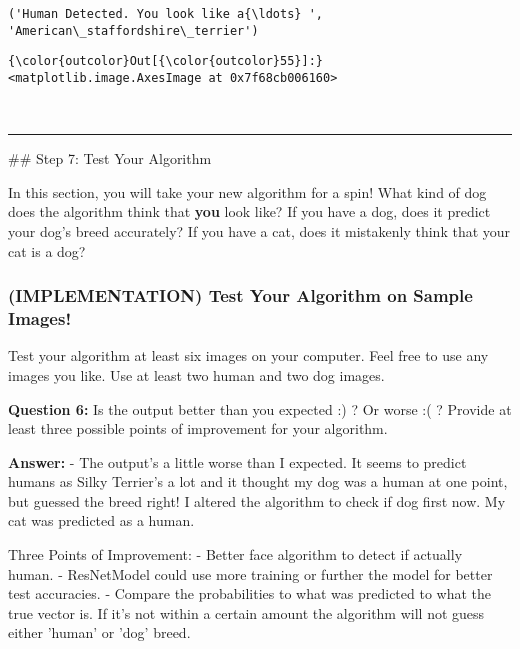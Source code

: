 \documentclass[11pt]{article}
\begin{document}
    \begin{Verbatim}[commandchars=\\\{\}]
('Human Detected. You look like a{\ldots} ', 'American\_staffordshire\_terrier')

    \end{Verbatim}

\begin{Verbatim}[commandchars=\\\{\}]
{\color{outcolor}Out[{\color{outcolor}55}]:} <matplotlib.image.AxesImage at 0x7f68cb006160>
\end{Verbatim}
            
    \begin{center}
    \end{center}
    { \hspace*{\fill} \\}
    
    \begin{center}\rule{0.5\linewidth}{\linethickness}\end{center}

 \#\# Step 7: Test Your Algorithm

In this section, you will take your new algorithm for a spin! What kind
of dog does the algorithm think that \textbf{you} look like? If you have
a dog, does it predict your dog's breed accurately? If you have a cat,
does it mistakenly think that your cat is a dog?

\subsubsection{(IMPLEMENTATION) Test Your Algorithm on Sample
Images!}\label{implementation-test-your-algorithm-on-sample-images}

Test your algorithm at least six images on your computer. Feel free to
use any images you like. Use at least two human and two dog images.

\textbf{Question 6:} Is the output better than you expected :) ? Or
worse :( ? Provide at least three possible points of improvement for
your algorithm.

\textbf{Answer:} - The output's a little worse than I expected. It seems
to predict humans as Silky Terrier's a lot and it thought my dog was a
human at one point, but guessed the breed right! I altered the algorithm
to check if dog first now. My cat was predicted as a human.

Three Points of Improvement: - Better face algorithm to detect if
actually human. - ResNetModel could use more training or further the
model for better test accuracies. - Compare the probabilities to what
was predicted to what the true vector is. If it's not within a certain
amount the algorithm will not guess either 'human' or 'dog' breed.
\end{document}
